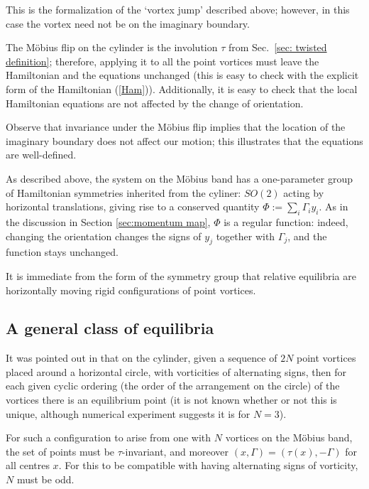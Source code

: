 \documentclass[11pt,twoside]{article}
\theoremstyle{definition}
\numberwithin{equation}{section}
\begin{document}
This is the formalization of the `vortex jump' described above; however, in this case the vortex need not be on the imaginary boundary. 

 The M\"obius flip on the cylinder is the involution $\tau$ from Sec.\ \ref{sec: twisted definition}; therefore, applying it to all the point vortices must leave the Hamiltonian and the equations unchanged (this is easy to check with the explicit form of the Hamiltonian (\ref{Ham})). Additionally, it is easy to check that the local Hamiltonian equations are not affected by the change of orientation.



     

Observe that invariance under the M\"obius flip implies that the location of the imaginary boundary does not affect our motion; this illustrates that the equations are well-defined. 


 As described above, the system on the  M\"obius band has a one-parameter group of Hamiltonian symmetries inherited from the cyliner: $SO(2)$ acting by horizontal translations, giving rise to  a conserved quantity $\Phi:=\sum_i\Gamma_iy_i$. As in the  discussion in Section \ref{sec:momentum map}, $\Phi$ is a regular function: indeed, changing the orientation changes the signs of $y_j$ together with $\Gamma_j$, and the function stays unchanged. 

         It is immediate from the form of the symmetry group that relative equilibria are horizontally moving rigid  configurations of point vortices.
         
     

         
         
         
          
    
   
   

\subsection{A general class of equilibria}
    \label{sec:equilibria}
It was pointed out in \cite{montaldi2003vortex} that on the cylinder, given a sequence of $2N$ point vortices placed around a horizontal circle, with vorticities of alternating signs, then for each given cyclic ordering (the order of the arrangement on the circle)  of the vortices 
there is an equilibrium point (it is not known whether or not this is unique, although numerical experiment suggests it is for $N=3$).  

For such a configuration to arise from one with $N$ vortices on the M\"obius band, the set of points must be $\tau$-invariant, and moreover $(x,\Gamma)=(\tau(x),-\Gamma)$ for all centres $x$. For this to be compatible with having alternating signs of vorticity, $N$ must be odd. 
\end{document}
